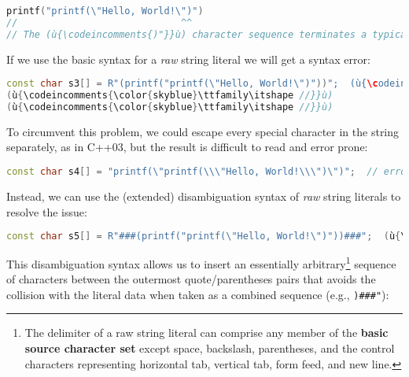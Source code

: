 \begin{lstlisting}[language=C++]
printf("printf(\"Hello, World!\")")
//                             ^^
// The (ù{\codeincomments{)"}}ù) character sequence terminates a typical raw string literal.
\end{lstlisting}
    
\noindent If we use the basic syntax for a \emph{raw} string literal we will get a
syntax error:

\begin{lstlisting}[language=C++,]
const char s3[] = R"(printf("printf(\"Hello, World!\")"))";  (ù{\codeincomments{\color{skyblue}\ttfamily\itshape // collision}}ù)
(ù{\codeincomments{\color{skyblue}\ttfamily\itshape //}}ù)                                                    (ù{\codeincomments{\color{skyblue}\ttfamily\itshape\textasciicircum\textasciicircum}}ù)
(ù{\codeincomments{\color{skyblue}\ttfamily\itshape //}}ù)                       (ù{\codeincomments{\color{skyblue}\ttfamily\itshape Syntax error after literal ends}}ù)
\end{lstlisting}
    
\noindent To circumvent this problem, we could escape every special character in
the string separately, as in C++03, but the result is difficult to read
and error prone:

\begin{lstlisting}[language=C++]
const char s4[] = "printf(\"printf(\\\"Hello, World!\\\")\")";  // error prone
\end{lstlisting}
    
\noindent Instead, we can use the (extended) disambiguation syntax of \emph{raw}
string literals to resolve the issue:

\begin{lstlisting}[language=C++]
const char s5[] = R"###(printf("printf(\"Hello, World!\")"))###";  (ù{\codeincomments{\color{skyblue}\ttfamily\itshape // cleaner}}ù)
\end{lstlisting}
    
\noindent This disambiguation syntax allows us to insert an essentially
arbitrary{\cprotect\footnote{The delimiter of a raw string literal can
comprise any member of the \textbf{basic source character set} except
space, backslash, parentheses, and the control characters representing
  horizontal tab, vertical tab, form feed, and new line.}} sequence of
characters between the outermost quote/parentheses pairs that avoids the
collision with the literal data when taken as a combined sequence (e.g.,
\texttt{)\#\#\#"}):

